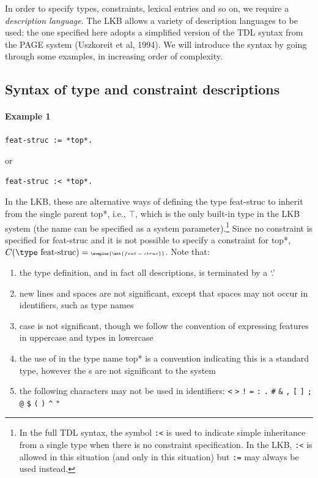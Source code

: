 \documentclass[12pt]{report}
\newcommand{\newterm}[1]{{\it #1}}
\begin{document}
In order to specify types, constraints, lexical entries and so on, we require
a \newterm{description language}.
The LKB allows a variety of description languages to be used: the one
specified here adopts a simplified version of the TDL syntax from the PAGE
system (Uszkoreit et al, 1994).
We will introduce the syntax by
going through some examples, in increasing order of complexity.

\subsection{Syntax of type and constraint descriptions}
\label{typesyntax}

\paragraph{Example 1}

\begin{verbatim}
feat-struc := *top*.
\end{verbatim}
or
\begin{verbatim}
feat-struc :< *top*.
\end{verbatim}
In the LKB, these are alternative ways of defining 
the type {\type feat-struc} to inherit from the single
parent {\type *top*}, i.e., $\top$,
which is the only built-in type 
in the LKB system (the name can be specified as a 
system parameter).\footnote{In the full 
TDL syntax, the symbol {\tt :<} is 
used to indicate simple inheritance
from a single type when there is no constraint specification.
In the LKB, {\tt :<} is allowed in this situation (and only in this situation)
but {\tt :=} may always be used instead.}
Since no constraint is specified for {\type feat-struc} and it is
not possible to specify a constraint for {\type *top*},
$C(\mbox{\type feat-struc})= \mbox{\tiny $\avmplus{\att{feat-struc}}$}$.
Note that:
\begin{enumerate}
\item the type 
definition, and in fact all descriptions,  is terminated by a `.'
\item new lines and spaces are not significant, except that spaces
may not occur in identifiers, such as type names
\item case is not significant, though we follow the
convention of expressing features in uppercase and types in lowercase
\item the use of {\tt *} in the type name {\type *top*} is a convention
indicating this is a standard type, however the {\tt *}s are not significant
to the system
\item  the following characters may not be used in identifiers:
{\tt <} {\tt >} {\tt !} {\tt =} {\tt :} 
{\tt .} {\tt \#} {\tt \&} {\tt ,} {\tt [}
{\tt ]} {\tt ;} {\tt @} {\tt \$} {\tt (} {\tt )} {\tt \verb+^+} {\tt "}
\end{enumerate}
\end{document}
